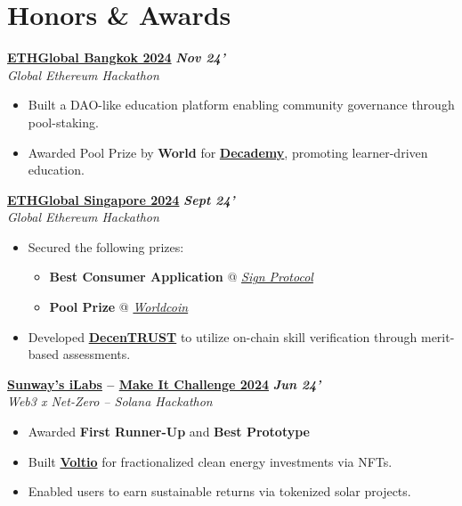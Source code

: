 \documentclass[letterpaper,10pt]{article}
\newcommand{\heading}[2]{
  \hspace{4pt}#1\hfill#2\\
}
\newcommand{\headingBf}[2]{
  \heading{\textbf{#1}}{
    \textbf{\textit{\small{#2}}}
  }
}
\newenvironment{bulletList}{
  \begin{itemize}[itemsep=1pt, parsep=1pt, leftmargin=26pt]
}{
  \end{itemize}
}
\newcommand{\oneFrag}[4]{
  \headingBf{#1}{#2}
  \hspace{6pt}\textit{#3}
  \vspace{-4pt}
  #4
}
\newenvironment{nestedBulletList}{
  \begin{itemize}[itemsep=1pt, parsep=1pt, leftmargin=14pt]
}{
  \end{itemize}
}
\begin{document}
\section{Honors \& Awards}

\vspace{2pt}
\oneFrag{
  \href{https://ethglobal.com/events/bangkok}{ETHGlobal Bangkok 2024}
}{
  Nov 24'
}{
  Global Ethereum Hackathon
}{
  \begin{bulletList}
    \item Built a DAO-like education platform enabling community governance through pool-staking.
    \item Awarded Pool Prize by \textbf{World} for \textbf{\href{https://ethglobal.com/showcase/decademy-8g59p}{Decademy}}, promoting learner-driven education.
  \end{bulletList}
}

\vspace{2pt}
\oneFrag{
  \href{https://ethglobal.com/events/singapore2024}{ETHGlobal Singapore 2024}
}{
  Sept 24'
}{
  Global Ethereum Hackathon
}{
  \begin{bulletList}
    \item Secured the following prizes:
    \vspace{-4pt}
    \begin{nestedBulletList}
      \item
      \textbf{Best Consumer Application} @ \textit{\href{https://sign.global}{Sign Protocol}}
      \item
      \textbf{Pool Prize} @ \textit{\href{https://worldcoin.org}{Worldcoin}}
    \end{nestedBulletList}
    \item Developed \textbf{\href{https://ethglobal.com/showcase/decentrust-vwp81}{DecenTRUST}} to utilize on-chain skill verification through merit-based assessments.
  \end{bulletList}
}

\vspace{2pt}
\oneFrag{
  \href{https://innovationlabs.sunway.edu.my}{Sunway's iLabs} --
  \href{https://x.com/SuperteamMY/status/1815758624716931379}{Make It Challenge 2024}
}{
  Jun 24'
}{
  Web3 x Net-Zero -- Solana Hackathon
}{
  \begin{bulletList}
    \item Awarded
    \textbf{First Runner-Up} and
    \textbf{Best Prototype}
    \item Built \textbf{\href{https://github.com/eesuhn/voltio}{Voltio}} for fractionalized clean energy investments via NFTs.
    \item Enabled users to earn sustainable returns via tokenized solar projects.
  \end{bulletList}
}
\end{document}

